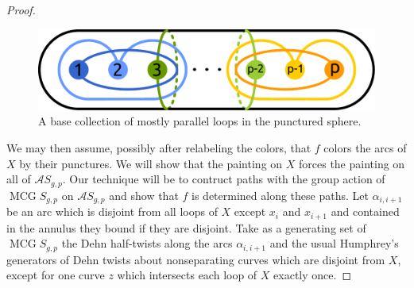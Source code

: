\documentclass[11pt]{article}
\DeclareMathOperator{\mcg}{MCG}
\theoremstyle{remark}
\theoremstyle{definition}
\begin{document}
\begin{proof}
  \begin{figure}
    \includegraphics[width=.6\textwidth]{figures/pcolorspher.pdf}
    \caption{A base collection of mostly parallel loops in the punctured sphere.}
    \label{fig:pcolors}
  \end{figure}


  We may then assume, possibly after relabeling the colors,
  that $f$ colors the arcs of $X$ by their punctures.
  We will show that the painting on $X$ forces
  the painting on all of $\mathcal A S_{g,p}$.
  Our technique will be to contruct paths with the group action
  of $\mcg S_{g,p}$ on $\mathcal A S_{g,p}$
  and show that $f$ is determined along these paths.
  Let $\alpha_{i,i+1}$ be an arc which is disjoint from
  all loops of $X$ except $x_i$ and $x_{i+1}$
  and contained in the annulus they bound if they are disjoint.
  Take as a generating set of $\mcg S_{g,p}$
  the Dehn half-twists along the arcs $\alpha_{i,i+1}$
  and the usual Humphrey's generators
  of Dehn twists about nonseparating curves
  which are disjoint from $X$, except for one curve $z$
  which intersects each loop of $X$ exactly once.


\end{proof}
\end{document}
